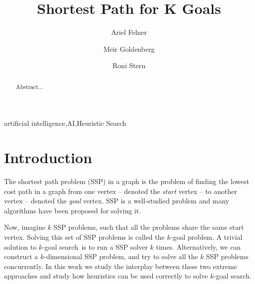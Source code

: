 \documentclass{aicom2e}
\newcommand{\kgs}{$k$-goal search}
\begin{document}
\begin{frontmatter}                           %
%
\title{Shortest Path for K Goals}
\maketitle
%
\author[]{Ariel Felner}
\address{Ben Gurion University of the Negev\\ Be'er Sheva, Israel\\
	E-mail: felner@bgu.ac.il}

\author[]{Meir Goldenberg}
\address{The Jerusalem College of Technology\\ Jerusalem, Israel\\
	E-mail: mgoldenbe@gmail.com}
\author[]{Roni Stern}
\address{Ben Gurion University of the Negev\\ Be'er Sheva, Israel\\
	E-mail: roni.stern@gmail.com}

\begin{abstract}
Abstract...

\end{abstract}

\begin{keyword}
artificial intelligence\sep AI\sep Heuristic Search
\end{keyword}
%
\end{frontmatter}

\section*{Introduction}


The shortest path problem (SSP) in a graph is the problem of finding the lowest cost path in a graph from one vertex -- denoted the {\em start} vertex -- to another vertex -- denoted the {\em goal} vertex. 
SSP is a well-studied problem and many algorithms have been proposed for solving it. 

Now, imagine $k$ SSP problems, such that all the problems share the same start vertex. 
Solving this set of SSP problems is called the $k$-goal problem. 
A trivial solution to \kgs\ is to run a SSP solver $k$ times. Alternatively, 
we can construct a $k$-dimensional SSP problem, and try to solve all the $k$ SSP problems concurrently. 
In this work we study the interplay between these two extreme approaches and
study how heuristics can be used correctly to solve \kgs. 
\end{document}
